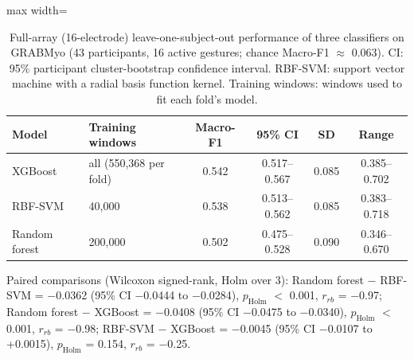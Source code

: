 \begin{table}[htbp]
\centering
\small
\caption{Full-array (16-electrode) leave-one-subject-out performance of three classifiers on GRABMyo (43 participants, 16 active gestures; chance Macro-F1 $\approx$ 0.063). CI: 95\% participant cluster-bootstrap confidence interval. RBF-SVM: support vector machine with a radial basis function kernel. Training windows: windows used to fit each fold's model.}
\label{tab:full_channel}
\setlength{\tabcolsep}{4pt}
\begin{adjustbox}{max width=\textwidth}
\begin{tabular}{llcccc}
\toprule
Model & Training windows & Macro-F1 & 95\% CI & SD & Range \\
\midrule
XGBoost & all (550{,}368 per fold) & 0.542 & 0.517--0.567 & 0.085 & 0.385--0.702 \\
RBF-SVM & 40{,}000 & 0.538 & 0.513--0.562 & 0.085 & 0.383--0.718 \\
Random forest & 200{,}000 & 0.502 & 0.475--0.528 & 0.090 & 0.346--0.670 \\
\bottomrule
\end{tabular}
\end{adjustbox}
\par\smallskip\parbox{0.95\linewidth}{\footnotesize Paired comparisons (Wilcoxon signed-rank, Holm over 3): Random forest $-$ RBF-SVM = $-$0.0362 (95\% CI $-$0.0444 to $-$0.0284), $p_{\mathrm{Holm}}$ $<$ 0.001, $r_{rb}$ = $-$0.97; Random forest $-$ XGBoost = $-$0.0408 (95\% CI $-$0.0475 to $-$0.0340), $p_{\mathrm{Holm}}$ $<$ 0.001, $r_{rb}$ = $-$0.98; RBF-SVM $-$ XGBoost = $-$0.0045 (95\% CI $-$0.0107 to +0.0015), $p_{\mathrm{Holm}}$ = 0.154, $r_{rb}$ = $-$0.25.}
\end{table}
